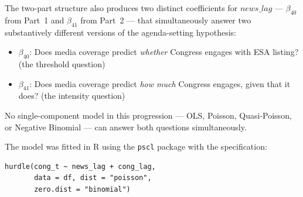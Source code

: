\documentclass[11pt]{article}
\begin{document}
The two-part structure also produces two distinct coefficients for
$\mathit{news\_lag}$ --- $\beta_{40}$ from Part~1 and $\beta_{41}$ from Part~2 --- that simultaneously answer two substantively different versions of the agenda-setting hypothesis:
\begin{itemize}[itemsep=2pt]
  \item $\beta_{40}$: Does media coverage predict \textit{whether}
    Congress engages with ESA listing? (the threshold question)
  \item $\beta_{41}$: Does media coverage predict \textit{how much}
    Congress engages, given that it does? (the intensity question)
\end{itemize}
No single-component model in this progression --- OLS, Poisson,
Quasi-Poisson, or Negative Binomial --- can answer both questions
simultaneously.

The model was fitted in R \citep{RCoreTeam} using the \texttt{pscl}
package \citep{Zeileis2008} with the specification:
\begin{verbatim}
hurdle(cong_t ~ news_lag + cong_lag,
       data = df, dist = "poisson",
       zero.dist = "binomial")
\end{verbatim}


\end{document}

